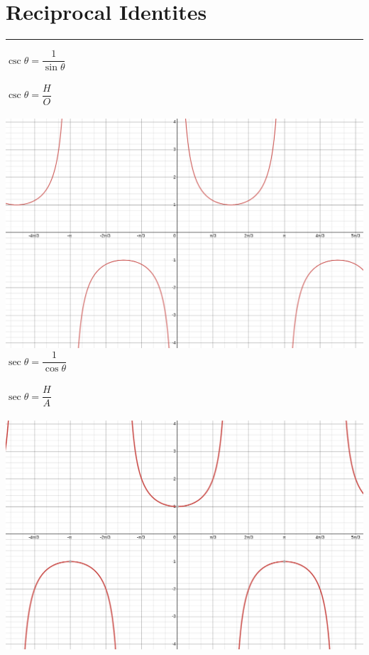 \documentclass{article}
\begin{document}
\section{Reciprocal Identites}
\hrule
\begin{multicols}{3}
    \noindent
    $\csc \theta = \dfrac{1}{\sin \theta}$        \\\\
    $\csc \theta = \dfrac{H}{O}$                  \\\\
    \includegraphics[scale=0.15]{images/csc.png} \\
    $\sec \theta = \dfrac{1}{\cos \theta}$        \\\\
    $\sec \theta = \dfrac{H}{A}$                  \\\\
    \includegraphics[scale=0.15]{images/sec.png} \\

\end{multicols}
\end{document}
